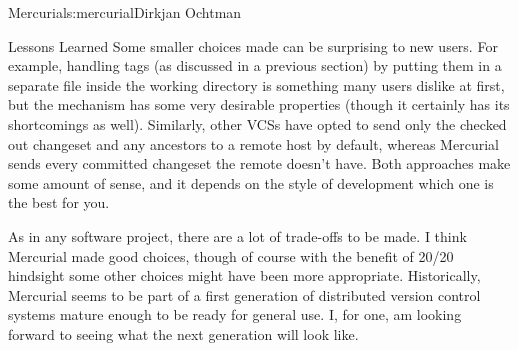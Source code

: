 \begin{aosachapter}{Mercurial}{s:mercurial}{Dirkjan Ochtman}
\begin{aosasect1}{Lessons Learned}
Some smaller choices made can be surprising to new users. For example,
handling tags (as discussed in a previous section) by putting them in
a separate file inside the working directory is something many users
dislike at first, but the mechanism has some very desirable properties
(though it certainly has its shortcomings as well). Similarly, other
VCSs have opted to send only the checked out changeset and any
ancestors to a remote host by default, whereas Mercurial sends every
committed changeset the remote doesn't have. Both approaches make some
amount of sense, and it depends on the style of development which one
is the best for you.

As in any software project, there are a lot of trade-offs to be made.
I think Mercurial made good choices, though of course with the benefit
of 20/20 hindsight some other choices might have been more appropriate.
Historically, Mercurial seems to be part of a first generation of
distributed version control systems mature enough to be ready for
general use. I, for one, am looking forward to seeing what the next
generation will look like.

\end{aosasect1}

\end{aosachapter}
